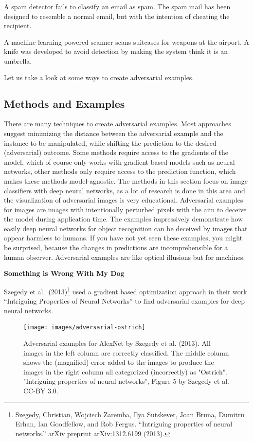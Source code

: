 \documentclass[
  11pt,
]{scrbook}
\begin{document}
A spam detector fails to classify an email as spam.
The spam mail has been designed to resemble a normal email, but with the intention of cheating the recipient.

A machine-learning powered scanner scans suitcases for weapons at the airport.
A knife was developed to avoid detection by making the system think it is an umbrella.

Let us take a look at some ways to create adversarial examples.

\hypertarget{methods-and-examples}{%
\subsection{Methods and Examples}\label{methods-and-examples}}

There are many techniques to create adversarial examples.
Most approaches suggest minimizing the distance between the adversarial example and the instance to be manipulated, while shifting the prediction to the desired (adversarial) outcome.
Some methods require access to the gradients of the model, which of course only works with gradient based models such as neural networks, other methods only require access to the prediction function, which makes these methods model-agnostic.
The methods in this section focus on image classifiers with deep neural networks, as a lot of research is done in this area and the visualization of adversarial images is very educational.
Adversarial examples for images are images with intentionally perturbed pixels with the aim to deceive the model during application time.
The examples impressively demonstrate how easily deep neural networks for object recognition can be deceived by images that appear harmless to humans.
If you have not yet seen these examples, you might be surprised, because the changes in predictions are incomprehensible for a human observer.
Adversarial examples are like optical illusions but for machines.

\textbf{Something is Wrong With My Dog}

Szegedy et al.~(2013)\footnote{Szegedy, Christian, Wojciech Zaremba, Ilya Sutskever, Joan Bruna, Dumitru Erhan, Ian Goodfellow, and Rob Fergus. ``Intriguing properties of neural networks.'' arXiv preprint arXiv:1312.6199 (2013).} used a gradient based optimization approach in their work ``Intriguing Properties of Neural Networks'' to find adversarial examples for deep neural networks.

\begin{figure}

{\centering \texttt{[image: images/adversarial-ostrich]} 

}

\caption{Adversarial examples for AlexNet by Szegedy et al. (2013). All images in the left column are correctly classified. The middle column shows the (magnified) error added to the images to produce the images in the right column all categorized (incorrectly) as "Ostrich". "Intriguing properties of neural networks", Figure 5 by Szegedy et al. CC-BY 3.0.}\label{fig:adversarial-ostrich}
\end{figure}
\end{document}
